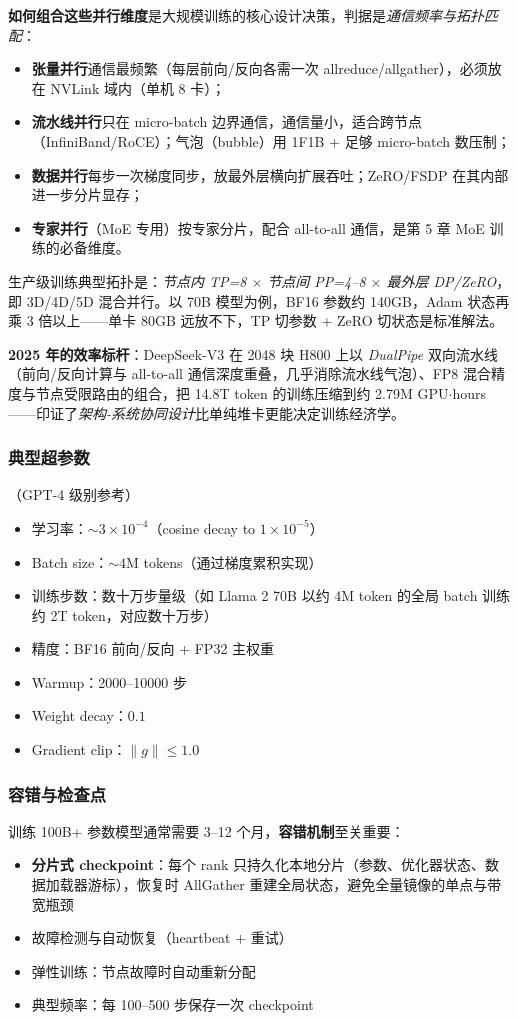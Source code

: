 \documentclass[12pt,a4paper]{article}
\begin{document}
\textbf{如何组合这些并行维度}是大规模训练的核心设计决策，判据是\emph{通信频率与拓扑匹配}：
\begin{itemize}
  \item \textbf{张量并行}通信最频繁（每层前向/反向各需一次 allreduce/allgather），必须放在 NVLink 域内（单机 8 卡）；
  \item \textbf{流水线并行}只在 micro-batch 边界通信，通信量小，适合跨节点（InfiniBand/RoCE）；气泡（bubble）用 1F1B + 足够 micro-batch 数压制；
  \item \textbf{数据并行}每步一次梯度同步，放最外层横向扩展吞吐；ZeRO/FSDP 在其内部进一步分片显存；
  \item \textbf{专家并行}（MoE 专用）按专家分片，配合 all-to-all 通信，是第 5 章 MoE 训练的必备维度。
\end{itemize}
生产级训练典型拓扑是：\emph{节点内 TP=8 $\times$ 节点间 PP=4--8 $\times$ 最外层 DP/ZeRO}，即 3D/4D/5D 混合并行。以 70B 模型为例，BF16 参数约 140GB，Adam 状态再乘 3 倍以上——单卡 80GB 远放不下，TP 切参数 + ZeRO 切状态是标准解法。

\textbf{2025 年的效率标杆}：DeepSeek-V3 在 2048 块 H800 上以 \emph{DualPipe} 双向流水线（前向/反向计算与 all-to-all 通信深度重叠，几乎消除流水线气泡）、FP8 混合精度与节点受限路由的组合，把 14.8T token 的训练压缩到约 2.79M GPU$\cdot$hours——印证了\emph{架构-系统协同设计}比单纯堆卡更能决定训练经济学。

\subsubsection{典型超参数}（GPT-4 级别参考）
\begin{itemize}
  \item 学习率：$\sim 3 \times 10^{-4}$（cosine decay to $1 \times 10^{-5}$）
  \item Batch size：$\sim 4\text{M}$ tokens（通过梯度累积实现）
  \item 训练步数：数十万步量级（如 Llama 2 70B 以约 4M token 的全局 batch 训练约 2T token，对应数十万步）
  \item 精度：BF16 前向/反向 + FP32 主权重
  \item Warmup：2000--10000 步
  \item Weight decay：$0.1$
  \item Gradient clip：$\|g\| \leq 1.0$
\end{itemize}

\subsubsection{容错与检查点}
训练 100B+ 参数模型通常需要 3--12 个月，\textbf{容错机制}至关重要：
\begin{itemize}
  \item \textbf{分片式 checkpoint}：每个 rank 只持久化本地分片（参数、优化器状态、数据加载器游标），恢复时 AllGather 重建全局状态，避免全量镜像的单点与带宽瓶颈
  \item 故障检测与自动恢复（heartbeat + 重试）
  \item 弹性训练：节点故障时自动重新分配
  \item 典型频率：每 100--500 步保存一次 checkpoint
\end{itemize}
\end{document}
